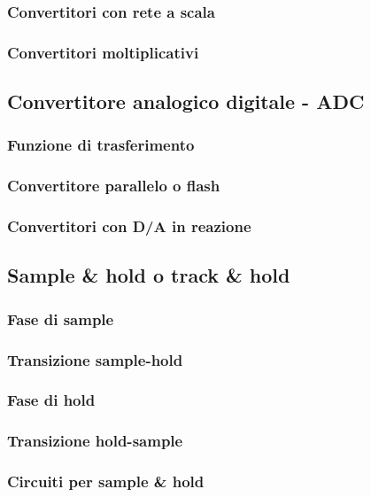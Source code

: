 \documentclass[../main.tex]{subfiles}
\begin{document}
\subsubsection{Convertitori con rete a scala}
\subsubsection{Convertitori moltiplicativi}

\subsection{Convertitore analogico digitale - ADC}
\subsubsection{Funzione di trasferimento }
\subsubsection{Convertitore parallelo o flash}
\subsubsection{Convertitori con D/A in reazione}

\subsection{Sample \& hold o track \& hold}
\subsubsection{Fase di sample}
\subsubsection{Transizione sample-hold}
\subsubsection{Fase di hold}
\subsubsection{Transizione hold-sample}
\subsubsection{Circuiti per sample \& hold}
\end{document}

